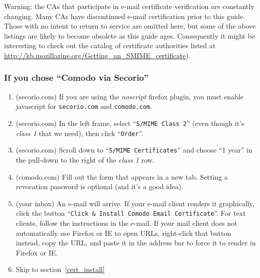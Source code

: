 \documentclass[pdftex,12pt,titlepage=false]{scrartcl}
\begin{document}
{\tiny Warning: the CAs that participate in e-mail certificate
  verification are constantly changing.  Many CAs have discontinued
  e-mail certification prior to this guide.  Those with no intent to
  return to service are omitted here, but some of the above listings
  are likely to become obsolete as this guide ages.  Consequently it
  might be interesting to check out the catalog of certificate
  authorities listed at
  \url{http://kb.mozillazine.org/Getting_an_SMIME_certificate}).\par}

\subsubsection{If you chose ``Comodo via Secorio''}
\begin{multicols}{2}
  \begin{enumerate}
  \item (secorio.com) If you are using the \emph{noscript} firefox
    plugin, you must enable javascript for \texttt{secorio.com} and
    \texttt{comodo.com}.
  \item (secorio.com) In the left frame, select ``\texttt{S/MIME Class
      2}'' (even though it's \emph{class 1} that we need), then click
    ``\texttt{Order}''.
  \item (secorio.com) Scroll down to ``\texttt{S/MIME Certificates}''
    and choose ``1 year'' in the pull-down to the right of the
    \emph{class 1} row.
  \item (comodo.com) Fill out the form that appears in a new tab.
    Setting a revocation password is optional (and it's a good
    idea).%
  \item (your inbox) An e-mail will arrive.  If your e-mail client
    renders it graphically, click the button ``\texttt{Click \&
      Install Comodo Email Certificate}''.  For text clients, follow
    the instructions in the e-mail.  If your mail client does not
    automatically use Firefox or IE to open URLs, right-click that
    button instead, copy the URL, and paste it in the address bar to
    force it to render in Firefox or IE.
  \item Skip to section~\ref{cert_install}
  \end{enumerate}
\end{multicols}
\end{document}
